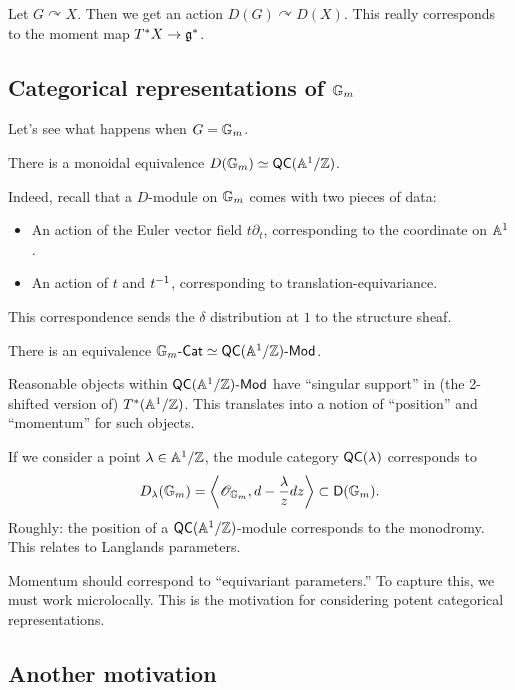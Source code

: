 \documentclass{article}
\begin{document}
\begin{ex}
  Let $G \curvearrowright X$.
  Then we get an action $D(G) \curvearrowright D(X)$.
  This really corresponds to the moment map $T^* X \to \gfr^*$.
\end{ex}

\subsection{Categorical representations of $\GG_m$}

Let's see what happens when $G = \GG_m$.

\begin{thm}
  There is a monoidal equivalence $D(\GG_m) \simeq \QC(\AA^1 / \ZZ)$.
\end{thm}

Indeed, recall that a $D$-module on $\GG_m$ comes with two pieces of data:
\begin{itemize}
  \item An action of the Euler vector field $t \partial_t$, corresponding to the coordinate on $\AA^1$.
  \item An action of $t$ and $t\inv$, corresponding to translation-equivariance.
\end{itemize}
This correspondence sends the $\delta$ distribution at $1$ to the structure sheaf.

\begin{cor}
  There is an equivalence $\GG_m\dCat \simeq \QC(\AA^1 / \ZZ)\dMod$.
\end{cor}

Reasonable objects within $\QC(\AA^1 / \ZZ)\dMod$ have ``singular support'' in (the 2-shifted version of) $T^*(\AA^1 / \ZZ)$.
This translates into a notion of ``position'' and ``momentum'' for such objects.

\begin{ex}
  If we consider a point $\lambda \in \AA^1 / \ZZ$, the module category $\QC(\lambda)$ corresponds to
  \[
    D_\lambda(\GG_m) = \angles{\Osc_{\GG_m}, d - \frac{\lambda}{z} dz} \subset \Dsf(\GG_m).
  \]
  Roughly: the position of a $\QC(\AA^1 / \ZZ)$-module corresponds to the monodromy.
  This relates to Langlands parameters.
\end{ex}

Momentum should correspond to ``equivariant parameters.''
To capture this, we must work microlocally.
This is the motivation for considering potent categorical representations.

\subsection{Another motivation}
\end{document}
